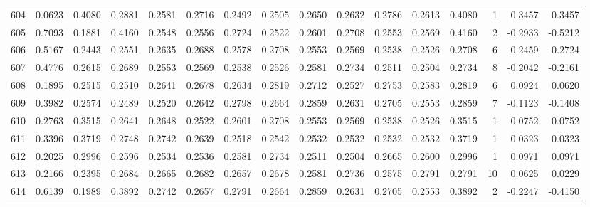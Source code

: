 \begin{tabular}{lrrrrrrrrrrrrrrr}
604 &      0.0623 &  0.4080 &  0.2881 &  0.2581 &  0.2716 &  0.2492 &  0.2505 &  0.2650 &  0.2632 &  0.2786 &   0.2613 &     0.4080 &      1 &                    0.3457 &                     0.3457 \\
605 &      0.7093 &  0.1881 &  0.4160 &  0.2548 &  0.2556 &  0.2724 &  0.2522 &  0.2601 &  0.2708 &  0.2553 &   0.2569 &     0.4160 &      2 &                   -0.2933 &                    -0.5212 \\
606 &      0.5167 &  0.2443 &  0.2551 &  0.2635 &  0.2688 &  0.2578 &  0.2708 &  0.2553 &  0.2569 &  0.2538 &   0.2526 &     0.2708 &      6 &                   -0.2459 &                    -0.2724 \\
607 &      0.4776 &  0.2615 &  0.2689 &  0.2553 &  0.2569 &  0.2538 &  0.2526 &  0.2581 &  0.2734 &  0.2511 &   0.2504 &     0.2734 &      8 &                   -0.2042 &                    -0.2161 \\
608 &      0.1895 &  0.2515 &  0.2510 &  0.2641 &  0.2678 &  0.2634 &  0.2819 &  0.2712 &  0.2527 &  0.2753 &   0.2583 &     0.2819 &      6 &                    0.0924 &                     0.0620 \\
609 &      0.3982 &  0.2574 &  0.2489 &  0.2520 &  0.2642 &  0.2798 &  0.2664 &  0.2859 &  0.2631 &  0.2705 &   0.2553 &     0.2859 &      7 &                   -0.1123 &                    -0.1408 \\
610 &      0.2763 &  0.3515 &  0.2641 &  0.2648 &  0.2522 &  0.2601 &  0.2708 &  0.2553 &  0.2569 &  0.2538 &   0.2526 &     0.3515 &      1 &                    0.0752 &                     0.0752 \\
611 &      0.3396 &  0.3719 &  0.2748 &  0.2742 &  0.2639 &  0.2518 &  0.2542 &  0.2532 &  0.2532 &  0.2532 &   0.2532 &     0.3719 &      1 &                    0.0323 &                     0.0323 \\
612 &      0.2025 &  0.2996 &  0.2596 &  0.2534 &  0.2536 &  0.2581 &  0.2734 &  0.2511 &  0.2504 &  0.2665 &   0.2600 &     0.2996 &      1 &                    0.0971 &                     0.0971 \\
613 &      0.2166 &  0.2395 &  0.2684 &  0.2665 &  0.2682 &  0.2657 &  0.2678 &  0.2581 &  0.2736 &  0.2575 &   0.2791 &     0.2791 &     10 &                    0.0625 &                     0.0229 \\
614 &      0.6139 &  0.1989 &  0.3892 &  0.2742 &  0.2657 &  0.2791 &  0.2664 &  0.2859 &  0.2631 &  0.2705 &   0.2553 &     0.3892 &      2 &                   -0.2247 &                    -0.4150 \\

\end{tabular}
